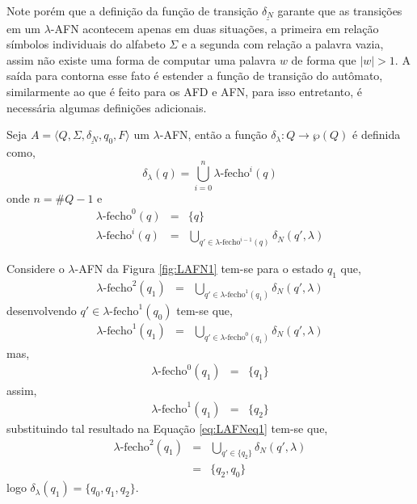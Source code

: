 Note porém que a definição da função de transição $\underline{\delta_N}$ garante que as transições em um $\lambda$-AFN acontecem apenas em duas situações, a primeira em relação símbolos individuais do alfabeto $\Sigma$ e a segunda com relação a palavra vazia, assim não existe uma forma de computar uma palavra $w$ de forma que $|w| > 1$. A saída para contorna esse fato é estender a função de transição do autômato, similarmente ao que é feito para os AFD e AFN, para isso entretanto, é necessária algumas definições adicionais.

\begin{definition}\label{def:L-fecho}
	Seja $A = \langle Q, \Sigma, \underline{\delta_N}, q_0, F\rangle$ um $\lambda$-AFN, então a função $\delta_\lambda: Q \rightarrow \wp(Q)$ é definida como,
	\begin{equation}
		\delta_\lambda(q) = \bigcup_{i = 0}^n\lambda\text{-fecho}^i(q)
	\end{equation}
	onde $n = \# Q - 1$ e
	\begin{eqnarray}
		\lambda\text{-fecho}^0(q) & = & \{q\}\\
		\lambda\text{-fecho}^{i}(q) & = & \bigcup_{q' \in \lambda\text{-fecho}^{i-1}(q)} \delta_N(q', \lambda)
	\end{eqnarray}
\end{definition}

\begin{example}
	Considere o $\lambda$-AFN da Figura \ref{fig:LAFN1} tem-se para o estado $q_1$ que,
	\begin{eqnarray}\label{eq:LAFNeq1}
		\lambda\text{-fecho}^{2}(q_1) & = &  \bigcup_{q' \in \lambda\text{-fecho}^{1}(q_1)} \delta_N(q', \lambda)
	\end{eqnarray}
	desenvolvendo $q' \in \lambda\text{-fecho}^{1}(q_0)$ tem-se que,
	\begin{eqnarray*}
		\lambda\text{-fecho}^{1}(q_1) & = &  \bigcup_{q' \in \lambda\text{-fecho}^{0}(q_1)} \delta_N(q', \lambda)
	\end{eqnarray*}
	mas, 
	\begin{eqnarray*}
		\lambda\text{-fecho}^{0}(q_1) & = & \{q_1\}
	\end{eqnarray*}
	assim, 
	\begin{eqnarray*}
		\lambda\text{-fecho}^{1}(q_1) & = &  \{q_2\}
	\end{eqnarray*}
	substituindo tal resultado na Equação \ref{eq:LAFNeq1} tem-se que, 
	\begin{eqnarray*}\label{eq:LAFNeq2}
		\lambda\text{-fecho}^{2}(q_1) & = & \bigcup_{q' \in \{q_2\}} \delta_N(q', \lambda)\\
		& = & \{q_2, q_0\}
	\end{eqnarray*}
	logo $\delta_\lambda(q_1) = \{q_0, q_1, q_2\}$.
\end{example}

